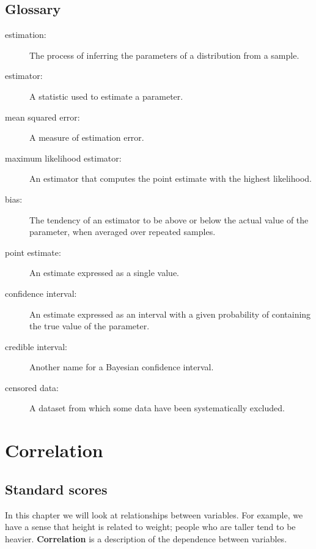 \documentclass[12pt]{book}
\begin{document}
\section{Glossary}

\begin{description}

\item[estimation:] The process of inferring the parameters of a distribution
from a sample.

\item[estimator:] A statistic used to estimate a parameter.

\item[mean squared error:] A measure of estimation error.

\item[maximum likelihood estimator:] An estimator that computes the
point estimate with the highest likelihood.

\item[bias:] The tendency of an estimator to be above or below the actual
value of the parameter, when averaged over repeated samples.

\item[point estimate:] An estimate expressed as a single value.

\item[confidence interval:] An estimate expressed as an interval with a
given probability of containing the true value of the parameter.

\item[credible interval:] Another name for a Bayesian confidence interval.

\item[censored data:] A dataset from which some data have been systematically
excluded.

\end{description}


\chapter{Correlation}

\section{Standard scores}

In this chapter we will look at relationships between variables.  For
example, we have a sense that height is related to weight; people who
are taller tend to be heavier.  {\bf Correlation} is a description of
the dependence between variables.
\end{document}
